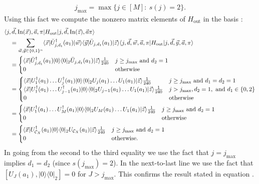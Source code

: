 \documentclass[../thesis-main/thesis-main]{subfiles}
\begin{document}
\begin{align}
j_{\max}=\max\{j\in[M]:\: s(j)=2\}.
\end{align}
Using this fact we compute the nonzero matrix elements of $H_{{\text{out}}}$ in the basis :
\begin{align}
&\langle j,\vec{d},\operatorname{In}(\vec{x}),\vec{a},\pi|H_{{\text{out}}}|j,\vec{d},\operatorname{In}(\vec{z}),\vec{a}\pi\rangle \nonumber\\
&\quad=\sum_{\vec{w},\vec{y}\in\{0,1\}^{n}}\langle\vec{x}|\bar{U}_{j,d_1}^{\dagger}(a_{1})|\vec{w}\rangle\langle\vec{y}| \bar{U}_{j,d_1}(a_{1})|\vec{z}\rangle\langle j,\vec{d},\vec{w},\vec{a},\pi|H_{{\text{out}}}|j,\vec{d},\vec{y},\vec{a},\pi\rangle\\
&\quad=\begin{cases}
\langle\vec{x}|\bar{U}_{j,d_1}^{\dagger}(a_{1})|0\rangle\langle0|_{2}\bar{U}_{j,d_1}(a_{1})|\vec{z}\rangle\frac{1}{240} & j\geq j_{\max}\text{ and }d_{2}=1\\
0 & \text{otherwise}
\end{cases} \\
&\quad=\begin{cases}
\langle\vec{x}|U_{1}^{\dagger}(a_{1})\ldots U_{j}^{\dagger}(a_{1})|0\rangle\langle0|_{2}U_{j}(a_{1})\ldots U_{1}(a_{1})|\vec{z}\rangle\frac{1}{240} & j\geq j_{\max}\text{ and }d_1=d_{2}=1\\
\langle\vec{x}|U_{1}^{\dagger}(a_{1})\ldots U_{j-1}^{\dagger}(a_{1})|0\rangle\langle0|_{2}U_{j-1}(a_{1})\ldots U_{1}(a_{1})|\vec{z}\rangle\frac{1}{240} & j> j_{\max}, d_{2}=1, \text{ and } d_1\in \{0,2\} \\
0 & \text{otherwise}
\end{cases}\\
&\quad=\begin{cases}
\langle\vec{x}|U_{1}^{\dagger}(a_{1})\ldots U_{M}^{\dagger}(a_{1})|0\rangle\langle0|_{2}U_{M}(a_{1})\ldots U_{1}(a_{1})|\vec{z}\rangle\frac{1}{240} & j\geq j_{\max}\text{ and }d_{2}=1\\
0 & \text{otherwise}
\end{cases}\\
&\quad=\begin{cases}
\langle\vec{x}|U_{\mathcal{C}_{X}}^{\dagger}(a_{1})|0\rangle\langle0|_{2}U_{\mathcal{C}_{X}}(a_{1})|\vec{z}\rangle\frac{1}{240} & j\geq j_{\max}\text{ and }d_{2}=1\\
0 & \text{otherwise.}
\end{cases}
\end{align}
In going from the second to the third equality we use the fact that $j=j_{\max}$ implies $d_1=d_2$ (since $s(j_{\max})=2$).
In the next-to-last line we use the fact that $[U_{J}(a_{1}),|0\rangle\langle0|_{2}]=0$ for $J>j_{\max}$. This confirms the result stated in equation .
\end{document}
